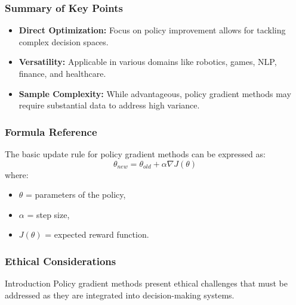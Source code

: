 \documentclass[aspectratio=169]{beamer}
\begin{document}
\begin{frame}[fragile]
    \frametitle{Summary of Key Points}
    \begin{itemize}
        \item \textbf{Direct Optimization:} Focus on policy improvement allows for tackling complex decision spaces.
        \item \textbf{Versatility:} Applicable in various domains like robotics, games, NLP, finance, and healthcare.
        \item \textbf{Sample Complexity:} While advantageous, policy gradient methods may require substantial data to address high variance.
    \end{itemize}
\end{frame}

\begin{frame}[fragile]
    \frametitle{Formula Reference}
    The basic update rule for policy gradient methods can be expressed as:
    \begin{equation}
        \theta_{new} = \theta_{old} + \alpha \nabla J(\theta)
    \end{equation}
    where:
    \begin{itemize}
        \item \( \theta \) = parameters of the policy,
        \item \( \alpha \) = step size,
        \item \( J(\theta) \) = expected reward function.
    \end{itemize}
\end{frame}

\begin{frame}[fragile]
    \frametitle{Ethical Considerations}
    \begin{block}{Introduction}
        Policy gradient methods present ethical challenges that must be addressed as they are integrated into decision-making systems.
    \end{block}
\end{frame}
\end{document}
